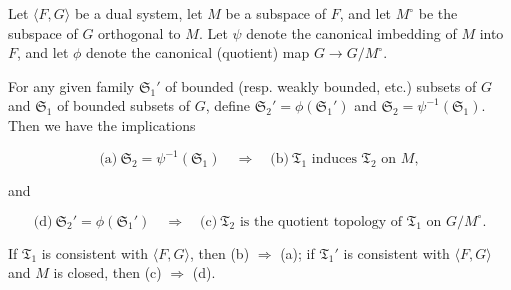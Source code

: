 Let $\langle F, G \rangle$ be a dual system, let $M$ be a subspace of $F$, and let $M^\circ$ be the subspace of $G$ orthogonal to $M$. Let $\psi$ denote the canonical imbedding of $M$ into $F$, and let $\phi$ denote the canonical (quotient) map $G \to G/M^\circ$.

For any given family $\mathfrak{S}_1'$ of bounded (resp. weakly bounded, etc.) subsets of $G$ and $\mathfrak{S}_1$ of bounded subsets of $G$, define $\mathfrak{S}_2' = \phi(\mathfrak{S}_1')$ and $\mathfrak{S}_2 = \psi^{-1}(\mathfrak{S}_1)$. Then we have the implications

$$\text{(a)} \ \mathfrak{S}_2 = \psi^{-1}(\mathfrak{S}_1) \quad \Rightarrow \quad \text{(b)} \ \mathfrak{T}_1 \text{ induces } \mathfrak{T}_2 \text{ on } M,$$

and

$$\text{(d)} \ \mathfrak{S}_2' = \phi(\mathfrak{S}_1') \quad \Rightarrow \quad \text{(c)} \ \mathfrak{T}_2 \text{ is the quotient topology of } \mathfrak{T}_1 \text{ on } G/M^\circ.$$

If $\mathfrak{T}_1$ is consistent with $\langle F, G \rangle$, then (b) $\Rightarrow$ (a); if $\mathfrak{T}_1'$ is consistent with $\langle F, G \rangle$ and $M$ is closed, then (c) $\Rightarrow$ (d).
